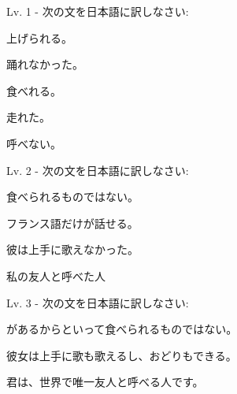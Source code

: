 
\author{Kristijan Čavić}

	
	\begin{mondai}{Lv. 1 - 次の文を日本語に訳しなさい: }
		\item 上げられる。
		\item 踊れなかった。
		\item 食べれる。
		\item 走れた。
		\item 呼べない。
	\end{mondai}
	
	\begin{mondai}{Lv. 2 - 次の文を日本語に訳しなさい:}
		\item 食べられるものではない。
		\item フランス語だけが話せる。
		\item 彼は上手に歌えなかった。
		\item 私の友人と呼べた人
	\end{mondai}
	
	\begin{mondai}{Lv. 3 - 次の文を日本語に訳しなさい:}
		\item {}があるからといって\footnotemark[1]食べられるものではない。
		\item 彼女は上手に歌も歌えるし、おどりもできる。
		\item 君は、世界で唯一友人と呼べる人です。
	\end{mondai}

